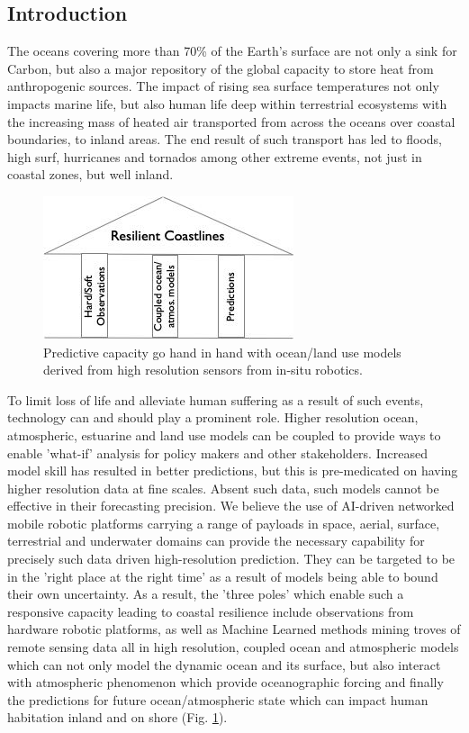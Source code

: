 \subsection*{Introduction}

The oceans covering more than 70\% of the Earth's surface are not only
a sink for Carbon, but also a major repository of the global capacity
to store heat from anthropogenic sources. The impact of rising sea
surface temperatures not only impacts marine life, but also human life
deep within terrestrial ecosystems with the increasing mass of heated
air transported from across the oceans over coastal boundaries, to
inland areas. The end result of such transport has led to floods, high
surf, hurricanes and tornados among other extreme events, not just in
coastal zones, but well inland.

\begin{figure}
  \centering
  \includegraphics[scale=0.5]{fig/trioka.jpg}
  \caption{Predictive capacity go hand in hand with ocean/land use
    models derived from high resolution sensors from in-situ robotics.}
  \label{fig:tri}
\end{figure}

To limit loss of life and alleviate human suffering as a result of
such events, technology can and should play a prominent role. Higher
resolution ocean, atmospheric, estuarine and land use models can be
coupled to provide ways to enable 'what-if' analysis for policy makers
and other stakeholders. Increased model skill has resulted in better
predictions, but this is pre-medicated on having higher resolution
data at fine scales. Absent such data, such models cannot be effective
in their forecasting precision. We believe the use of AI-driven
networked mobile robotic platforms carrying a range of payloads in
space, aerial, surface, terrestrial and underwater domains can provide
the necessary capability for precisely such data driven
high-resolution prediction. They can be targeted to be in the 'right
place at the right time' as a result of models being able to bound
their own uncertainty. As a result, the 'three poles' which enable
such a responsive capacity leading to coastal resilience include
observations from hardware robotic platforms, as well as Machine
Learned methods mining troves of remote sensing data all in high
resolution, coupled ocean and atmospheric models which can not only
model the dynamic ocean and its surface, but also interact with
atmospheric phenomenon which provide oceanographic forcing and finally
the predictions for future ocean/atmospheric state which can impact
human habitation inland and on shore (Fig. \ref{fig:tri}).

